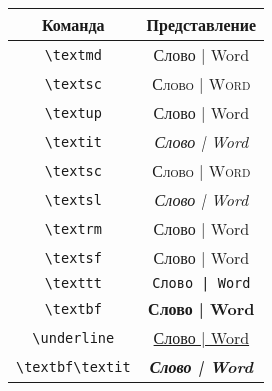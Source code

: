 \documentclass[a4paper,14pt]{extarticle}
\begin{document}
\begin{center}
\begin{tabular}{|cc|}
	\hline Команда & Представление \\ \hline
	\verb|\textmd|  & \textmd{Слово | Word} \\ 
	\verb|\textsc|  & \textsc{Слово | Word} \\ 
	\verb|\textup|  & \textup{Слово | Word} \\ 
	\verb|\textit|  & \textit{Слово | Word} \\ 
	\verb|\textsc|  & \textsc{Слово | Word} \\ 
	\verb|\textsl|  & \textsl{Слово | Word} \\ 
	\verb|\textrm|  & \textrm{Слово | Word} \\ 
	\verb|\textsf|  & \textsf{Слово | Word} \\ 
	\verb|\texttt|  & \texttt{Слово | Word} \\ 
	\verb|\textbf|  & \textbf{Слово | Word} \\ 
	\verb|\underline|  & \underline{Слово | Word} \\ 
	\verb|\textbf\textit|  & \textbf{\textit{Слово | Word}} \\   \hline
\end{tabular}
\end{center}
\end{document}
